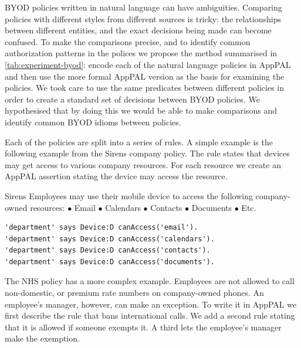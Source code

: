 \documentclass[thesis.tex]{subfiles}
\begin{document}
BYOD policies written in natural language can have ambiguities. Comparing
policies with different styles from different sources is tricky: the
relationships between different entities, and the exact decisions being made can
become confused. 
%
To make the comparisons precise, and to identify common authorization patterns in the polices we propose the method summarised in \autoref{tab:experiment-byod}: encode each of the natural language policies in AppPAL and then use the more formal AppPAL version as the basis for examining the policies.
We took care to use the same predicates between
different policies in order to create a standard set of decisions between \ac{BYOD}
policies. We hypothesised that by doing this we would be able to make comparisons and identify common BYOD idioms between policies.

Each of the policies are split into a series of rules. A simple example is the
following example from the Sirens company policy. The rule states that devices
may get access to various company resources. For each resource we create an
AppPAL assertion stating the device may access the resource.

\begin{policyrule}{Sirens}
  Employees may use their mobile device to access the following company-owned resources:
  \newline $\bullet$ Email $\bullet$ Calendars $\bullet$ Contacts $\bullet$ Documents $\bullet$ Etc.
  \normalfont
  \begin{lstlisting}
'department' says Device:D canAccess('email').
'department' says Device:D canAccess('calendars').
'department' says Device:D canAccess('contacts').
'department' says Device:D canAccess('documents').
  \end{lstlisting}
\end{policyrule}

The NHS policy has a more complex example. Employees are not
allowed to call non-domestic, or premium rate numbers on company-owned
phones. An employee's manager, however, can make an exception.
To write it in AppPAL we first describe the
rule that bans international calls. We add a second rule stating that it is
allowed if someone exempts it. A third lets the employee's manager 
make the exemption.
\end{document}
